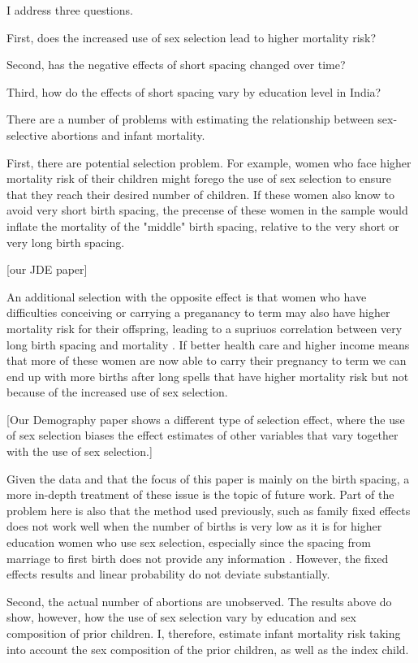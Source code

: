\documentclass[12pt,letterpaper]{article}
\begin{document}
I address three questions.

First, does the increased use of sex selection lead to higher mortality risk?

Second, has the negative effects of short spacing changed over time?

Third, how do the effects of short spacing vary by education level in India?


There are a number of problems with estimating the relationship between 
sex-selective abortions and infant mortality.

First, there are potential selection problem.
For example, women who face higher mortality risk of their children might forego 
the use of sex selection to ensure that they reach their desired number of 
children.
If these women also know to avoid very short birth spacing, the precense of 
these women in the sample would inflate the mortality of the "middle" birth
spacing, relative to the very short or very long birth spacing.

[our JDE paper]

An additional selection with the opposite effect is that women who have
difficulties conceiving or carrying a preganancy to term may also have higher 
mortality risk for their offspring, leading to a supriuos correlation
between very long birth spacing and mortality \citep{Kozuki2013}. 
If better health care and higher income means that more of these women are
now able to carry their pregnancy to term we can end up with more births
after long spells that have higher mortality risk but not because of the
increased use of sex selection.

[Our Demography paper shows a different type of selection effect, where the
use of sex selection biases the effect estimates of other variables that
vary together with the use of sex selection.]

Given the data and that the focus of this paper is mainly on the birth
spacing, a more in-depth treatment of these issue is the topic of future work.
Part of the problem here is also that the method used previously, such
as family fixed effects does not work well when the number of births is
very low as it is for higher education women who use sex 
selection, especially since the spacing from marriage to first birth
does not provide any information \citep{Kozuki2013,Molitoris2019}.
However, the fixed effects results and linear probability do not deviate
substantially.

Second, the actual number of abortions are unobserved.
The results above do show, however, how the use of sex selection vary
by education and sex composition of prior children.
I, therefore, estimate infant mortality risk taking into account the
sex composition of the prior children, as well as the index child.
\end{document}
